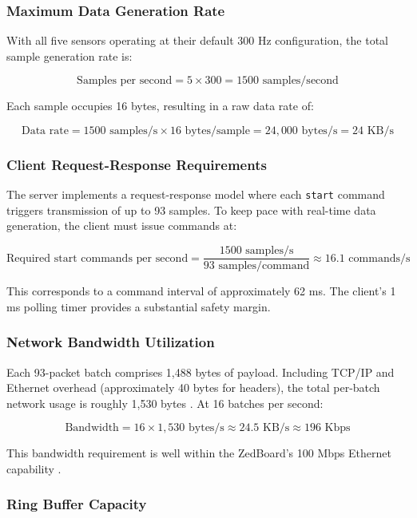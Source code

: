 \subsubsection{Maximum Data Generation Rate}

With all five sensors operating at their default 300 Hz configuration, the total sample generation rate is:

\[
\text{Samples per second} = 5 \times 300 = 1500 \text{ samples/second}
\]

Each sample occupies 16 bytes, resulting in a raw data rate of:

\[
\text{Data rate} = 1500 \text{ samples/s} \times 16 \text{ bytes/sample} = 24,000 \text{ bytes/s} = 24 \text{ KB/s}
\]

\subsubsection{Client Request-Response Requirements}

The server implements a request-response model where each \texttt{start} command triggers transmission of up to 93 samples. To keep pace with real-time data generation, the client must issue commands at:

\[
\text{Required start commands per second} = \frac{1500 \text{ samples/s}}{93 \text{ samples/command}} \approx 16.1 \text{ commands/s}
\]

This corresponds to a command interval of approximately 62 ms. The client's 1 ms polling timer \cite{apue} provides a substantial safety margin.

\subsubsection{Network Bandwidth Utilization}

Each 93-packet batch comprises 1,488 bytes of payload. Including TCP/IP and Ethernet overhead (approximately 40 bytes for headers), the total per-batch network usage is roughly 1,530 bytes \cite{tcpipv1}. At 16 batches per second:

\[
\text{Bandwidth} = 16 \times 1,530 \text{ bytes/s} \approx 24.5 \text{ KB/s} \approx 196 \text{ Kbps}
\]

This bandwidth requirement is well within the ZedBoard's 100 Mbps Ethernet capability \cite{unp, amd-ug1085}.

\subsubsection{Ring Buffer Capacity}

